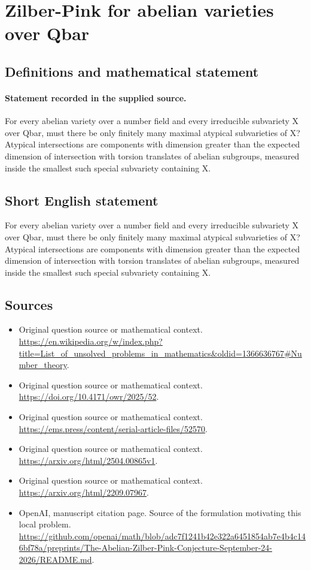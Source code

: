 \documentclass[11pt]{article}
\begin{document}
\section*{Zilber-Pink for abelian varieties over Qbar}\label{30007254}
\subsection{Definitions and mathematical statement}
\paragraph{Statement recorded in the supplied source.}
For every abelian variety over a number field and every irreducible subvariety X over Qbar, must there be only finitely many maximal atypical subvarieties of X? Atypical intersections are components with dimension greater than the expected dimension of intersection with torsion translates of abelian subgroups, measured inside the smallest such special subvariety containing X.
\subsection{Short English statement}
For every abelian variety over a number field and every irreducible subvariety X over Qbar, must there be only finitely many maximal atypical subvarieties of X? Atypical intersections are components with dimension greater than the expected dimension of intersection with torsion translates of abelian subgroups, measured inside the smallest such special subvariety containing X.
\subsection{Sources}
\begin{itemize}
\item[S1] Original question source or mathematical context.
\url{https://en.wikipedia.org/w/index.php?title=List_of_unsolved_problems_in_mathematics&oldid=1366636767#Number_theory}.
\item[S2] Original question source or mathematical context.
\url{https://doi.org/10.4171/owr/2025/52}.
\item[S3] Original question source or mathematical context.
\url{https://ems.press/content/serial-article-files/52570}.
\item[S4] Original question source or mathematical context.
\url{https://arxiv.org/html/2504.00865v1}.
\item[S5] Original question source or mathematical context.
\url{https://arxiv.org/html/2209.07967}.
\item[S6] OpenAI, manuscript citation page. Source of the formulation motivating this local problem.
\url{https://github.com/openai/math/blob/adc7f1241b42e322a6451854ab7e4b4c146bf78a/preprints/The-Abelian-Zilber-Pink-Conjecture-September-24-2026/README.md}.
\end{itemize}
\end{document}
